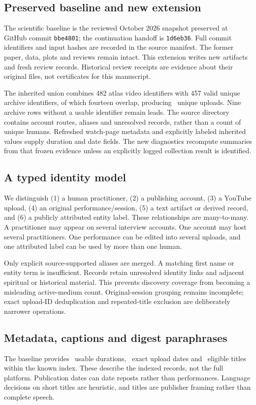 \subsection{Preserved baseline and new extension}
The scientific baseline is the reviewed October 2026 snapshot preserved at GitHub commit \texttt{bbe4801}; the continuation handoff is \texttt{1d6eb36}. Full commit identifiers and input hashes are recorded in the source manifest. The former paper, data, plots and reviews remain intact. This extension writes new artifacts and fresh review records. Historical review receipts are evidence about their original files, not certificates for this manuscript.

The inherited union combines 482 atlas video identifiers with 457 valid unique archive identifiers, of which fourteen overlap, producing \UploadN\ unique uploads. Nine archive rows without a usable identifier remain leads. The source directory contains account routes, aliases and unresolved records, rather than a count of unique humans. Refreshed watch-page metadata and explicitly labeled inherited values supply duration and date fields. The new diagnostics recompute summaries from that frozen evidence unless an explicitly logged collection result is identified.



\subsection{A typed identity model}
We distinguish (1) a human practitioner, (2) a publishing account, (3) a YouTube upload, (4) an original performance/session, (5) a text artifact or derived record, and (6) a publicly attributed entity label. These relationships are many-to-many. A practitioner may appear on several interview accounts. One account may host several practitioners. One performance can be edited into several uploads, and one attributed label can be used by more than one human.

Only explicit source-supported aliases are merged. A matching first name or entity term is insufficient. Records retain unresolved identity links and adjacent spiritual or historical material. This prevents discovery coverage from becoming a misleading active-medium count. Original-session grouping remains incomplete; exact upload-ID deduplication and repeated-title exclusion are deliberately narrower operations.

\subsection{Metadata, captions and digest paraphrases}
The baseline provides \DurationN\ usable durations, \DateN\ exact upload dates and \TitleN\ eligible titles within the known index. These describe the indexed records, not the full platform. Publication dates can date reposts rather than performances. Language decisions on short titles are heuristic, and titles are publisher framing rather than complete speech.

